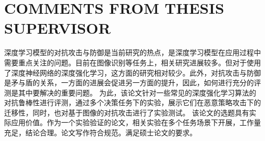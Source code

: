 
\chapter{COMMENTS FROM THESIS SUPERVISOR}

深度学习模型的对抗攻击与防御是当前研究的热点，是深度学习模型在应用过程中需要重点关注的问题。目前在图像识别等任务上，相关研究进展较多。但对于使用了深度神经网络的深度强化学习，这方面的研究相对较少。此外，对抗攻击与防御是矛与盾的关系，一方面的进展会促进另一方面的提升，因此，如何进行充分的评测是其中要解决的重要问题。 为此，该论文针对一些常见的深度强化学习算法的对抗鲁棒性进行评测，通过多个决策任务下的实验，展示它们在恶意策略攻击下的迁移性，同时，也对基于图像的对抗攻击进行了实验测试。 该论文的选题具有实际应用价值。作为一个实验验证的论文，相关实验在多个任务场景下开展，工作量充足，结论合理。论文写作符合规范。满足硕士论文的要求。
